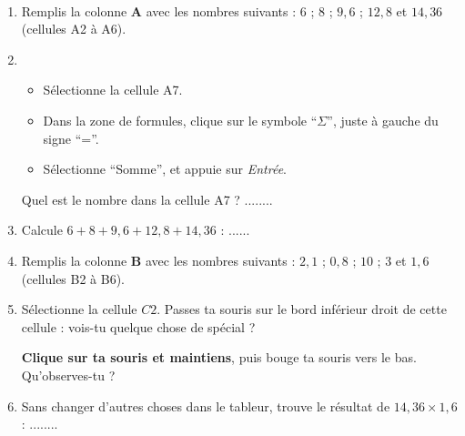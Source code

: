 \documentclass[a4paper,11pt]{article}
\begin{document}
\begin{exercice}\
	\begin{enumerate}
		\item Remplis la colonne \textbf{A} avec les nombres suivants : $6$ ; $8$ ; $9{,}6$ ; $12{,}8$ et $14{,}36$ (cellules A2 à A6).
		\item \begin{itemize}
			      \item Sélectionne la cellule A7.
			      \item Dans la zone de formules, clique sur le symbole “$Σ$”, juste à gauche du signe “=”.
			      \item Sélectionne “Somme”, et appuie sur \textit{Entrée}.
		      \end{itemize}
		      Quel est le nombre dans la cellule A7 ? ........
		\item Calcule $6 + 8 + 9{,}6 + 12{,}8 + 14{,}36$ : ......
		\item Remplis la colonne \textbf{B} avec les nombres suivants : $2{,}1$ ; $0{,}8$ ; $10$ ; $3$ et $1{,}6$ (cellules B2 à B6).
		\item Sélectionne la cellule $C2$. Passes ta souris sur le bord inférieur droit de cette cellule : vois-tu quelque chose de spécial ?

		      \textbf{Clique sur ta souris et maintiens}, puis bouge ta souris vers le bas. Qu'observes-tu ?
		\item Sans changer d'autres choses dans le tableur, trouve le résultat de $14{,}36 × 1{,}6$ : ........
	\end{enumerate}
\end{exercice}
\end{document}
